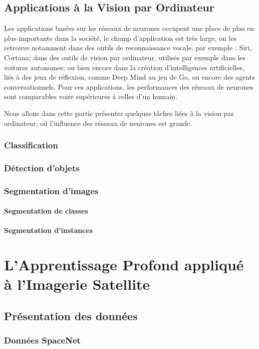 \documentclass[a4paper, 10pt]{report}
\begin{document}
\section{Applications à la Vision par Ordinateur}
Les applications basées sur les réseaux de neurones occupent une place de plus en plus importante dans la société, le champ d'application est très large, on les retrouve notamment dans des outils de reconnaissance vocale, par exemple : Siri, Cortana; dans des outils de vision par ordinateur, utilisés par exemple dans les voitures autonomes; ou bien encore dans la création d'intelligences artificielles, liés à des jeux de réflexion, comme Deep Mind au jeu de Go, ou encore des agents conversationnels.
Pour ces applications, les performances des réseaux de neurones sont comparables voire supérieures à celles d'un humain.

Nous allons dans cette partie présenter quelques tâches liées à la vision par ordinateur, où l'influence des réseaux de neurones est grande.
\subsection{Classification}

\subsection{Détection d'objets}
\subsection{Segmentation d'images}
\subsubsection{Segmentation de classes}
\subsubsection{Segmentation d'instances}
\chapter{L'Apprentissage Profond appliqué à l'Imagerie Satellite}
\section{Présentation des données}
\subsection{Données SpaceNet}
\end{document}
